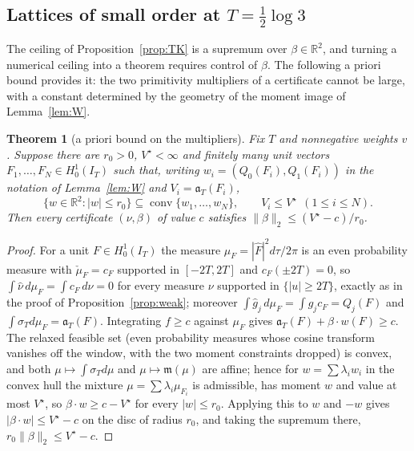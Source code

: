 \documentclass[11pt]{amsart}
\newtheorem{theorem}{Theorem}[section]
\theoremstyle{definition}
\theoremstyle{remark}
\newcommand{\R}{\mathbb R}
\newcommand{\IT}{I_T}
\newcommand{\sT}{\sigma_T}
\newcommand{\gh}[1]{\widehat g_{#1}}
\newcommand{\nuh}{\widehat\nu}
\newcommand{\Fh}{\widehat F}
\newcommand{\cF}{c_F}
\begin{document}
\subsection{Lattices of small order at $T=\tfrac12\log3$}\label{subsec:N}
The ceiling of Proposition~\ref{prop:TK} is a supremum over $\beta\in\R^2$, and turning a numerical
ceiling into a theorem requires control of $\beta$. The following a priori bound provides it: the
two primitivity multipliers of a certificate cannot be large, with a constant determined by the
geometry of the moment image of Lemma~\ref{lem:W}.

\begin{theorem}[a priori bound on the multipliers]\label{thm:Bbeta}
Fix $T$ and nonnegative weights $v$. Suppose there are $r_0>0$, $V^\star<\infty$ and finitely many
unit vectors $F_1,\dots,F_N\in H^1_0(\IT)$ such that, writing $w_i=(Q_0(F_i),Q_1(F_i))$ in the
notation of Lemma~\ref{lem:W} and $V_i=\mathfrak a_T(F_i)$,
\[
\{w\in\R^2:|w|\le r_0\}\subseteq\operatorname{conv}\{w_1,\dots,w_N\},\qquad V_i\le V^\star\ \ (1\le i\le N).
\]
Then every certificate $(\nu,\beta)$ of value $c$ satisfies $\|\beta\|_2\le(V^\star-c)/r_0$.
\end{theorem}
\begin{proof}
For a unit $F\in H^1_0(\IT)$ the measure $\mu_F=|\Fh|^2d\tau/2\pi$ is an even probability measure with
$\check\mu_F=\cF$ supported in $[-2T,2T]$ and $\cF(\pm2T)=0$, so $\int\nuh\,d\mu_F=\int\cF\,d\nu=0$ for
every measure $\nu$ supported in $\{|u|\ge2T\}$, exactly as in the proof of
Proposition~\ref{prop:weak}; moreover $\int\gh j\,d\mu_F=\int g_j\cF=Q_j(F)$ and
$\int\sT d\mu_F=\mathfrak a_T(F)$. Integrating $f\ge c$ against $\mu_F$ gives
$\mathfrak a_T(F)+\beta\cdot w(F)\ge c$. The relaxed feasible set (even probability measures whose
cosine transform vanishes off the window, with the two moment constraints dropped) is
convex, and both $\mu\mapsto\int\sT d\mu$ and $\mu\mapsto\mathfrak m(\mu)$ are affine; hence for
$w=\sum\lambda_iw_i$ in the convex hull the mixture $\mu=\sum\lambda_i\mu_{F_i}$ is admissible, has
moment $w$ and value at most $V^\star$, so $\beta\cdot w\ge c-V^\star$ for every $|w|\le r_0$.
Applying this to $w$ and $-w$ gives $|\beta\cdot w|\le V^\star-c$ on the disc of radius $r_0$, and
taking the supremum there, $r_0\|\beta\|_2\le V^\star-c$.
\end{proof}
\end{document}
